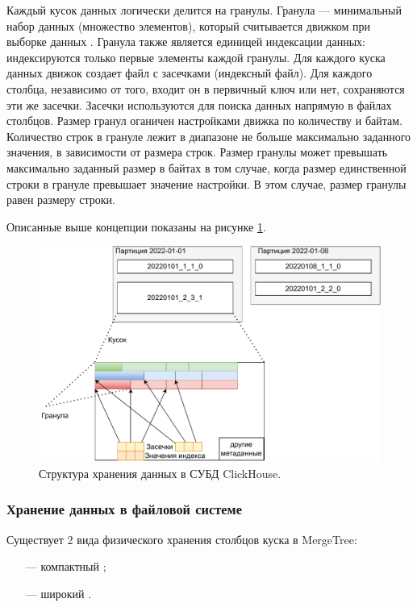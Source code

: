 Каждый кусок данных логически делится на гранулы. Гранула --- минимальный набор данных (множество элементов), который считывается движком при выборке данных \cite{mergetreearch}. Гранула также является единицей индексации данных: индексируются только первые элементы каждой гранулы. Для каждого куска данных движок создает файл с засечками (индексный файл). Для каждого столбца, независимо от того, входит он в первичный ключ или нет, сохраняются эти же засечки. Засечки используются для поиска данных напрямую в файлах столбцов. Размер гранул оганичен настройками движка по количеству и байтам. Количество строк в грануле лежит в диапазоне не больше максимально заданного значения, в зависимости от размера строк. Размер гранулы может превышать максимально заданный размер в байтах в том случае, когда размер единственной строки в грануле превышает значение настройки. В этом случае, размер гранулы равен размеру строки.

Описанные выше концепции показаны на рисунке \ref{fig:clickhousebase}.

\begin{figure}[hbtp]
	\centering
	\includegraphics[width=\textwidth]{img/clickhousebase.pdf}
	\caption{Структура хранения данных в СУБД ClickHouse.}
	\label{fig:clickhousebase}
\end{figure}

\subsubsection{Хранение данных в файловой системе}

Существует 2 вида физического хранения столбцов куска в MergeTree:
\begin{itemize}
    \item [---] компактный \cite{datapartcompact};
    \item [---] широкий \cite{datapartwide}.
\end{itemize}


